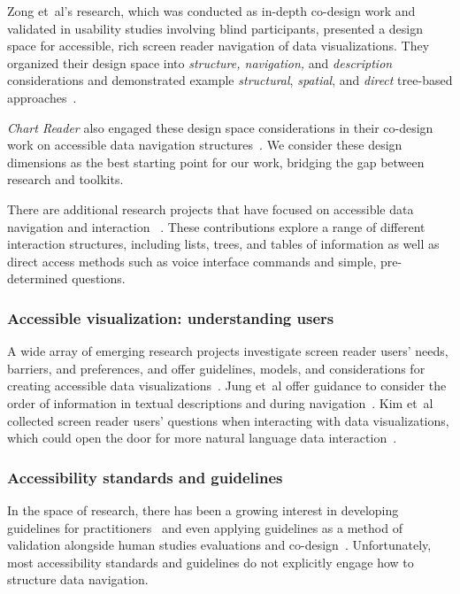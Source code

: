 \documentclass[12pt]{cmuthesis}
\newcommand{\ea}{{et~al\xperiod}\xspace}
\begin{document}
Zong \ea's research, which was conducted as in-depth co-design work and validated in usability studies involving blind participants, presented a design space for accessible, rich screen reader navigation of data visualizations. They organized their design space into \textit{structure, navigation,} and \textit{description} considerations and demonstrated example \textit{structural}, \textit{spatial}, and \textit{direct} tree-based approaches~\cite{Zong2022Rich}.

\textit{Chart Reader} also engaged these design space considerations in their co-design work on accessible data navigation structures~\cite{Thompson2023Chart}. We consider these design dimensions as the best starting point for our work, bridging the gap between research and toolkits.

There are additional research projects that have focused on accessible data navigation and interaction ~\cite{Sharif2022VoxLens,Sorge2016Polyfilling,Godfrey2018Accessible,Sharif2018evoGraphs}. These contributions explore a range of different interaction structures, including lists, trees, and tables of information as well as direct access methods such as voice interface commands and simple, pre-determined questions.

\subsubsection{Accessible visualization: understanding users}

A wide array of emerging research projects investigate screen reader users' needs, barriers, and preferences, and offer guidelines, models, and considerations for creating accessible data visualizations~\cite{Sharif2021,Lundgard2022Accessible,Chundury2022Towards,Fan2023Accessibility}. Jung \ea offer guidance to consider the order of information in textual descriptions and during navigation~\cite{Jung2022Communicating}. Kim \ea collected screen reader users' questions when interacting with data visualizations, which could open the door for more natural language data interaction~\cite{Kim2023Exploring}.

\subsubsection{Accessibility standards and guidelines}
In the space of research, there has been a growing interest in developing guidelines for practitioners~\cite{Elavsky2022Chartability, Durant2022Ten} and even applying guidelines as a method of validation alongside human studies evaluations and co-design~\cite{Lundgard2019Sociotechnical,Zong2022Rich,Lundgard2022Accessible,Fan2023Accessibility}. Unfortunately, most accessibility standards and guidelines do not explicitly engage how to structure data navigation. 
\end{document}
